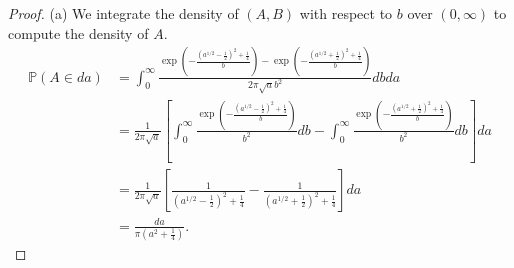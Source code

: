 \documentclass[bj]{imsart}
\numberwithin{equation}{section}
\renewcommand{\P}{\mathbb{P}}
\newcommand{\1}{\mathbf{1}}
\theoremstyle{definition}
\begin{document}
\begin{proof}
(a) We integrate the density of $(A,B)$ with respect to $b$ over $(0,\infty)$ to compute the density of $A$.
\begin{align*}
 \P(A\in da) &= \int_0^{\infty}
\frac{\exp\left(-\frac{\left(a^{1/2}-\frac{1}{2}\right)^2+\frac{1}{4}}{b}
\right)
-\exp\left(-\frac{\left(a^{1/2}+\frac{1}{2}\right)^2+\frac{1}{4}}{b}\right)}{2\pi \sqrt{a}b^2}  dbda\\
&=\frac{1}{2\pi \sqrt{a}}\left[\int_0^{\infty}
\frac{\exp\left(-\frac{\left(a^{1/2}-\frac{1}{2}\right)^2+\frac{1}{4}}{b}\right)}{b^2}  db-\int_0^{\infty}
\frac{\exp\left(-\frac{\left(a^{1/2}+\frac{1}{2}\right)^2+\frac{1}{4}}{b}
\right)}{b^2}  db\right]da\\
&=\frac{1}{2\pi \sqrt{a}}\left[\frac{1}{\left(a^{1/2}-\frac{1}{2}\right)^2+\frac{1}{4}}  -\frac{1}{\left(a^{1/2}+\frac{1}{2}\right)^2+\frac{1}{4}}\right]da\\
&=\frac{da}{\pi \left(a^2+\frac{1}{4}\right)}.
\end{align*}



\end{proof}
\end{document}
